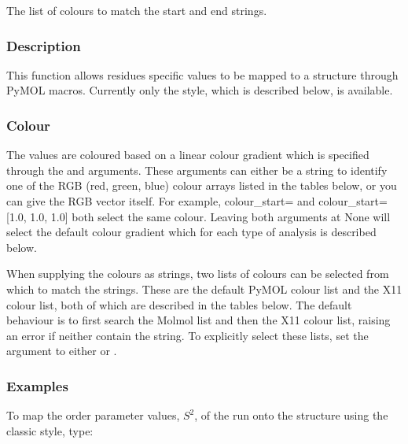    The list of colours to match the start and end strings.  

  

  
 \subsubsection{Description} 

 This function allows residues specific values to be mapped to a structure through PyMOL macros.  Currently only the  style, which is described below, is available. 
  

  
 \subsubsection{Colour} 

 The values are coloured based on a linear colour gradient which is specified through the  and  arguments.  These arguments can either be a string to identify one of the RGB (red, green, blue) colour arrays listed in the tables below, or you can give the RGB vector itself.  For example, colour\_start= and colour\_start=[1.0, 1.0, 1.0] both select the same colour.  Leaving both arguments at None will select the default colour gradient which for each type of analysis is described below. 
  

 When supplying the colours as strings, two lists of colours can be selected from which to match the strings.  These are the default PyMOL colour list and the X11 colour list, both of which are described in the tables below.  The default behaviour is to first search the Molmol list and then the X11 colour list, raising an error if neither contain the string. To explicitly select these lists, set the  argument to either  or . 
  

  
 \subsubsection{Examples} 

 To map the order parameter values, $S^2$, of the run  onto the structure using the classic style, type: 
  


